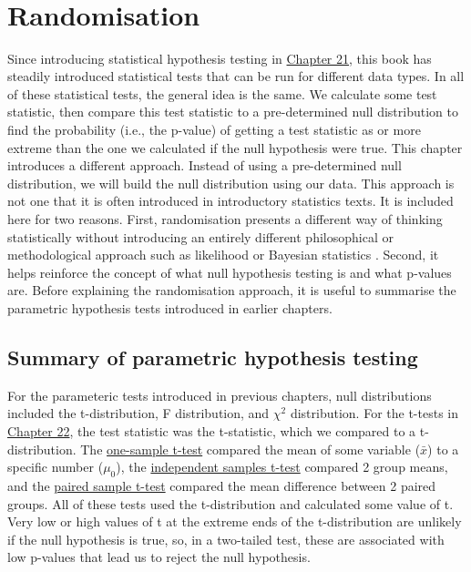\documentclass[
  openany]{krantz}
\begin{document}
\begin{verbatim}







\end{verbatim}

\hypertarget{Chapter_35}{%
\chapter{Randomisation}\label{Chapter_35}}

Since introducing statistical hypothesis testing in \protect\hyperlink{Chapter_21}{Chapter 21}, this book has steadily introduced statistical tests that can be run for different data types.
In all of these statistical tests, the general idea is the same.
We calculate some test statistic, then compare this test statistic to a pre-determined null distribution to find the probability (i.e., the p-value) of getting a test statistic as or more extreme than the one we calculated if the null hypothesis were true.
This chapter introduces a different approach.
Instead of using a pre-determined null distribution, we will build the null distribution using our data.
This approach is not one that it is often introduced in introductory statistics texts.
It is included here for two reasons.
First, randomisation presents a different way of thinking statistically without introducing an entirely different philosophical or methodological approach such as likelihood \citep{Edwards1972} or Bayesian statistics \citep{Lee1997}.
Second, it helps reinforce the concept of what null hypothesis testing is and what p-values are.
Before explaining the randomisation approach, it is useful to summarise the parametric hypothesis tests introduced in earlier chapters.

\hypertarget{summary-of-parametric-hypothesis-testing}{%
\section{Summary of parametric hypothesis testing}\label{summary-of-parametric-hypothesis-testing}}

For the parameteric tests introduced in previous chapters, null distributions included the t-distribution, F distribution, and \(\chi^{2}\) distribution.
For the t-tests in \protect\hyperlink{Chapter_22}{Chapter 22}, the test statistic was the t-statistic, which we compared to a t-distribution.
The \protect\hyperlink{one-sample-t-test}{one-sample t-test} compared the mean of some variable (\(\bar{x}\)) to a specific number (\(\mu_{0}\)), the \protect\hyperlink{independent-samples-t-test}{independent samples t-test} compared 2 group means, and the \protect\hyperlink{paired-sample-t-test}{paired sample t-test} compared the mean difference between 2 paired groups.
All of these tests used the t-distribution and calculated some value of t.
Very low or high values of t at the extreme ends of the t-distribution are unlikely if the null hypothesis is true, so, in a two-tailed test, these are associated with low p-values that lead us to reject the null hypothesis.
\end{document}
